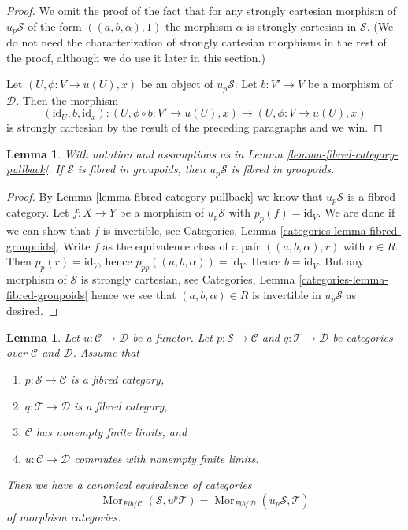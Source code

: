 \documentclass{stacks-project}
\theoremstyle{plain}
\newtheorem{lemma}[subsection]{Lemma}
\theoremstyle{definition}
\theoremstyle{remark}
\numberwithin{equation}{subsection}
\def\Mor{\mathop{\mathrm{Mor}}\nolimits}
\begin{document}
\begin{proof}
\medskip\noindent
We omit the proof of the fact that for any strongly cartesian morphism
of $u_p\mathcal{S}$ of the form $((a, b, \alpha), 1)$ the morphism
$\alpha$ is strongly cartesian in $\mathcal{S}$.
(We do not need the characterization of strongly cartesian morphisms
in the rest of the proof, although we do use it later in this section.)

\medskip\noindent
Let $(U, \phi : V \to u(U), x)$ be an object of $u_p\mathcal{S}$.
Let $b : V' \to V$ be a morphism of $\mathcal{D}$. Then the morphism
$$
(\text{id}_U, b, \text{id}_x) :
(U, \phi \circ b : V' \to u(U), x)
\longrightarrow
(U, \phi : V \to u(U), x)
$$
is strongly cartesian by the result of the preceding paragraphs and we win.
\end{proof}

\begin{lemma}
\label{lemma-fibred-groupoids-category-pullback}
With notation and assumptions as in
Lemma \ref{lemma-fibred-category-pullback}.
If $\mathcal{S}$ is fibred in groupoids, then $u_p\mathcal{S}$ is fibred
in groupoids.
\end{lemma}

\begin{proof}
By
Lemma \ref{lemma-fibred-category-pullback}
we know that $u_p\mathcal{S}$ is a fibred category.
Let $f : X \to Y$ be a morphism of $u_p\mathcal{S}$ with
$p_p(f) = \text{id}_V$. We are done if we can show that $f$ is invertible, see
Categories, Lemma \ref{categories-lemma-fibred-groupoids}.
Write $f$ as the equivalence class of
a pair $((a, b, \alpha), r)$ with $r \in R$. Then $p_p(r) = \text{id}_V$,
hence $p_{pp}((a, b, \alpha)) = \text{id}_V$. Hence $b = \text{id}_V$.
But any morphism of $\mathcal{S}$ is strongly cartesian, see
Categories, Lemma \ref{categories-lemma-fibred-groupoids}
hence we see that $(a, b, \alpha) \in R$ is invertible
in $u_p\mathcal{S}$ as desired.
\end{proof}

\begin{lemma}
\label{lemma-adjointness-pullback-pushforward}
Let $u : \mathcal{C} \to \mathcal{D}$ be a functor.
Let $p : \mathcal{S} \to \mathcal{C}$ and $q : \mathcal{T} \to \mathcal{D}$
be categories over $\mathcal{C}$ and $\mathcal{D}$. Assume that
\begin{enumerate}
\item $p : \mathcal{S} \to \mathcal{C}$ is a fibred category,
\item $q : \mathcal{T} \to \mathcal{D}$ is a fibred category,
\item $\mathcal{C}$ has nonempty finite limits, and
\item $u : \mathcal{C} \to \mathcal{D}$ commutes with nonempty finite limits.
\end{enumerate}
Then we have a canonical equivalence of categories
$$
\Mor_{\textit{Fib}/\mathcal{C}}(\mathcal{S}, u^p\mathcal{T})
=
\Mor_{\textit{Fib}/\mathcal{D}}(u_p\mathcal{S}, \mathcal{T})
$$
of morphism categories.
\end{lemma}
\end{document}
